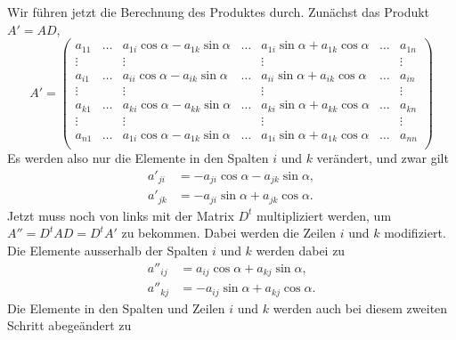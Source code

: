 Wir führen jetzt die Berechnung des Produktes durch.
Zunächst das Produkt $A'=AD$,
\[
A'
=
\begin{pmatrix}
a_{11}&\dots &a_{1i}\cos\alpha - a_{1k}\sin\alpha
		&\dots  & a_{1i}\sin\alpha+a_{1k}\cos\alpha
				&\dots	&a_{1n}\\
\vdots&      &\vdots
		&	&\vdots
				&	&\vdots\\
a_{i1}&\dots &a_{ii}\cos\alpha - a_{ik}\sin\alpha
		&\dots  & a_{ii}\sin\alpha+a_{ik}\cos\alpha
				&\dots	&a_{in}\\
\vdots&      &\vdots
		&	&\vdots
				&	&\vdots\\
a_{k1}&\dots &a_{ki}\cos\alpha - a_{kk}\sin\alpha
		&\dots  & a_{ki}\sin\alpha+a_{kk}\cos\alpha
				&\dots	&a_{kn}\\
\vdots&      &\vdots
		&	&\vdots
				&	&\vdots\\
a_{n1}&\dots &a_{1i}\cos\alpha - a_{1k}\sin\alpha
		&\dots  & a_{1i}\sin\alpha+a_{1k}\cos\alpha
				&\dots	&a_{nn}\\
\end{pmatrix}
\]
Es werden also nur die Elemente in den Spalten $i$ und $k$
verändert, und zwar gilt
\begin{equation}
\begin{aligned}
a'_{ji}&=-a_{ji}\cos\alpha-a_{jk}\sin\alpha,\\
a'_{jk}&=-a_{ji}\sin\alpha+a_{jk}\cos\alpha.
\end{aligned}
\label{dtad1}
\end{equation}
Jetzt muss noch von links mit der Matrix $D^t$
multipliziert werden, um $A''=D^tAD=D^tA'$ zu bekommen.
Dabei werden die Zeilen $i$ und $k$ modifiziert.
Die Elemente ausserhalb der Spalten $i$ und $k$ werden 
dabei zu
\begin{equation}
\begin{aligned}
a''_{ij}&=a_{ij}\cos\alpha+a_{kj}\sin\alpha,\\
a''_{kj}&=-a_{ij}\sin\alpha+a_{kj}\cos\alpha.
\end{aligned}
\label{dtad2}
\end{equation}
Die Elemente in den Spalten und Zeilen $i$ und $k$ werden
auch bei diesem zweiten Schritt abegeändert zu
